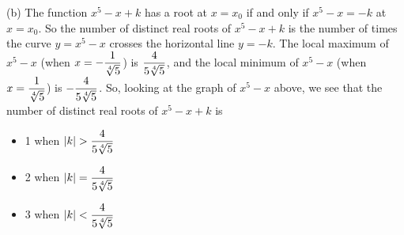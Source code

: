 \begin{solution}
\begin{center}\end{center}
\medskip
(b) The function
$x^5-x+k$ has a root at $x=x_0$ if and only if $x^5-x=-k$
  at $x=x_0$. So the number of distinct real roots of $x^5-x+k$ is the
  number of times the curve $y=x^5-x$ crosses the horizontal line $y=-k$.
  The local maximum of $x^5-x$ (when $x=-\dfrac{1}{\root{4}\of{5}}$)
  is $\dfrac{4}{5\root{4}\of{5}}$, and the local minimum of $x^5-x$
 (when $x=\dfrac{1}{\root{4}\of{5}}$) is $-\dfrac{4}{5\root{4}\of{5}}$.
  So, looking at the graph of $x^5-x$ above, we see that the number of distinct
  real roots of $x^5-x+k$ is
\begin{itemize}
\item 1 when $|k|>\dfrac{4}{5\root{4}\of{5}}$
\item 2 when $|k|=\dfrac{4}{5\root{4}\of{5}}$
\item 3 when $|k|<\dfrac{4}{5\root{4}\of{5}}$
\end{itemize}
\end{solution}



